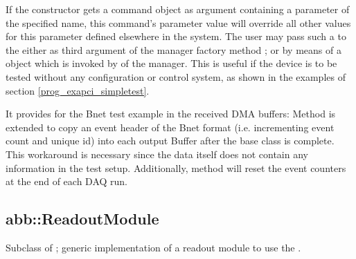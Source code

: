 \begin{compactenum}
If the constructor gets a command object  
as argument containing a parameter of the specified name,
this command's parameter value will override all other values
for this parameter defined elsewhere in the system. 
The user may pass such a  to the
 either as third argument of the manager factory method 
; or by means of a 
 object which is invoked by
 of the manager. This is useful if the device is to
be tested without any configuration or control system, as shown in the
examples of section \ref{prog_exapci_simpletest}.


\item It provides   for the Bnet test example in the 
received DMA buffers: 
Method  is extended to copy an event header of the Bnet format (i.e. incrementing event count and unique id) into each output Buffer after the base class  is complete. This workaround is necessary since the \ABB
data itself does not contain any information in the test setup.
Additionally, method  will reset the event counters
at the end of each DAQ run. 


\end{compactenum} 




\subsection{abb::ReadoutModule}
Subclass of ; generic implementation of a readout module to use the .

